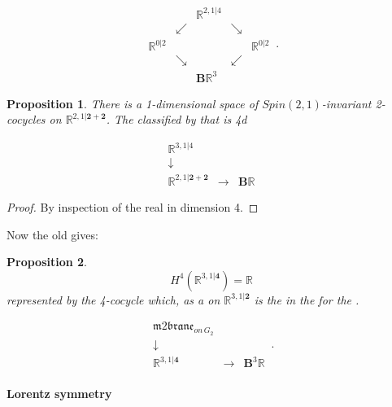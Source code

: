 \documentclass[12pt,titlepage]{article}
\newcommand{\itexarray}[1]{\begin{matrix}#1\end{matrix}}
\theoremstyle{plain}
\newtheorem{prop}{Proposition}
\theoremstyle{definition}
\theoremstyle{remark}
\begin{document}
\begin{displaymath}
\itexarray{
    && \mathbb{R}^{2,1\vert 4}
    \\
    & \swarrow && \searrow
    \\
    \mathbb{R}^{0 \vert 2} && && \mathbb{R}^{0\vert 2}
    \\
    & \searrow && \swarrow
    \\
    && \mathbf{B} \mathbb{R}^3
  }
  \,.
\end{displaymath}
\begin{prop}
\label{4dSuperMinkowskiSpacetime}\hypertarget{4dSuperMinkowskiSpacetime}{}
There is a 1-dimensional space of $Spin(2,1)$-invariant 2-cocycles on $\mathbb{R}^{2,1\vert \mathbf{2} + \mathbf{2}}$. The  classified by that is 4d 

\begin{displaymath}
\itexarray{
    \mathbb{R}^{3,1\vert 4}
    \\
    \downarrow
    \\
    \mathbb{R}^{2,1\vert \mathbf{2}+{\mathbf{2}}}
    &\longrightarrow&
    \mathbf{B}\mathbb{R}
  }
\end{displaymath}
\end{prop}
\begin{proof}
By inspection of the real  in dimension 4.

\end{proof}
Now the old  gives:

\begin{prop}
\label{TheStringIn4d}\hypertarget{TheStringIn4d}{}
\begin{displaymath}
H^4(\mathbb{R}^{3,1\vert \mathbf{4}}) = \mathbb{R}
\end{displaymath}
represented by the 4-cocycle which, as a   on $\mathbb{R}^{3,1\vert \mathbf{2}}$ is the  in the  for the .

\begin{displaymath}
\itexarray{
     \mathfrak{m}2\mathfrak{brane}_{on\,G_2}
     \\
     \downarrow
     \\
     \mathbb{R}^{3,1\vert  \mathbf{4} }
      &\stackrel{}{\longrightarrow}&
     \mathbf{B}^3 \mathbb{R}
  }
  \,.
\end{displaymath}
\end{prop}
\hypertarget{lorentz_symmetry}{}\paragraph*{{Lorentz symmetry}}\label{lorentz_symmetry}
\end{document}
